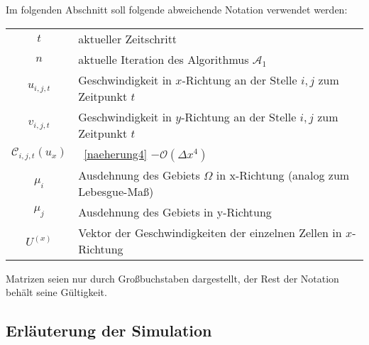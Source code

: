 Im folgenden Abschnitt soll folgende abweichende Notation verwendet werden:
\begin{table}[H]
    \begin{tabular}{c l}
        $t$ & aktueller Zeitschritt \\
        $n$ & aktuelle Iteration des Algorithmus $\mathcal{A}_1$ \\
        $u_{i,j,t}$ & Geschwindigkeit in $x$-Richtung an der Stelle $i,j$ zum Zeitpunkt $t$ \\
        $v_{i,j,t}$ & Geschwindigkeit in $y$-Richtung an der Stelle $i,j$ zum Zeitpunkt $t$ \\
        $\mathcal{C}_{i,j,t}(u_x)$ & ~\eqref{naeherung4} $- \mathcal{O}(\Delta x^4)$ \\
        $\mu_i$ & Ausdehnung des Gebiets $\Omega$ in x-Richtung (analog zum Lebesgue-Maß) \\
        $\mu_j$ & Ausdehnung des Gebiets in y-Richtung \\
        $U^{(x)}$ & Vektor der Geschwindigkeiten der einzelnen Zellen in $x$-Richtung \\
    \end{tabular}
\end{table}
Matrizen seien nur durch Großbuchstaben dargestellt, der Rest der Notation behält seine Gültigkeit.

\subsection{Erläuterung der Simulation}
\label{sec:sim}

